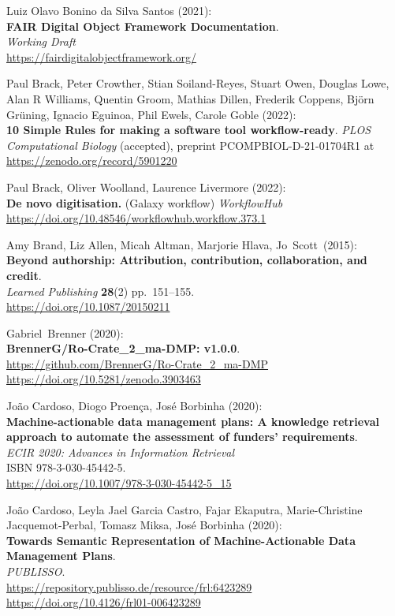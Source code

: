 \begin{thebibliography}{9}
Luiz Olavo Bonino da Silva Santos (2021):\\
\textbf{FAIR Digital Object Framework Documentation}.\\
\emph{Working Draft}\\
\url{https://fairdigitalobjectframework.org/}

Paul Brack, Peter Crowther, Stian Soiland-Reyes, Stuart Owen,
Douglas Lowe, Alan R Williams, Quentin Groom, Mathias Dillen, Frederik
Coppens, Björn Grüning, Ignacio Eguinoa, Phil Ewels, Carole Goble
(2022):\\
\textbf{10 Simple Rules for making a software tool workflow-ready}.
\emph{PLOS Computational Biology} (accepted), preprint
PCOMPBIOL-D-21-01704R1 at \url{https://zenodo.org/record/5901220}

Paul Brack, Oliver Woolland, Laurence Livermore
(2022):\\
\textbf{De novo digitisation.} (Galaxy workflow) \emph{WorkflowHub}\\
\url{https://doi.org/10.48546/workflowhub.workflow.373.1}

Amy Brand, Liz Allen, Micah Altman, Marjorie Hlava, Jo~Scott~(2015):\\
\textbf{Beyond authorship: Attribution, contribution, collaboration, and
credit}.\\
\emph{Learned Publishing} \textbf{28}(2) pp.~151--155.\\
\url{https://doi.org/10.1087/20150211}

Gabriel~Brenner (2020):\\
\textbf{BrennerG/Ro-Crate\_2\_ma-DMP: v1.0.0}.\\
\url{https://github.com/BrennerG/Ro-Crate_2_ma-DMP}\\
\url{https://doi.org/10.5281/zenodo.3903463}

João Cardoso, Diogo Proença, José Borbinha (2020):\\
\textbf{Machine-actionable data management plans: A knowledge retrieval
approach to automate the assessment of funders' requirements}.\\
\emph{ECIR 2020: Advances in Information Retrieval}\\
ISBN 978-3-030-45442-5.\\
\url{https://doi.org/10.1007/978-3-030-45442-5_15}

João Cardoso, Leyla Jael Garcia Castro, Fajar Ekaputra, Marie-Christine Jacquemot-Perbal, Tomasz Miksa, José Borbinha (2020):\\
\textbf{Towards Semantic Representation of Machine-Actionable Data
Management Plans}.\\
\emph{PUBLISSO}.\\
\url{https://repository.publisso.de/resource/frl:6423289}\\
\url{https://doi.org/10.4126/frl01-006423289}


\end{thebibliography}
